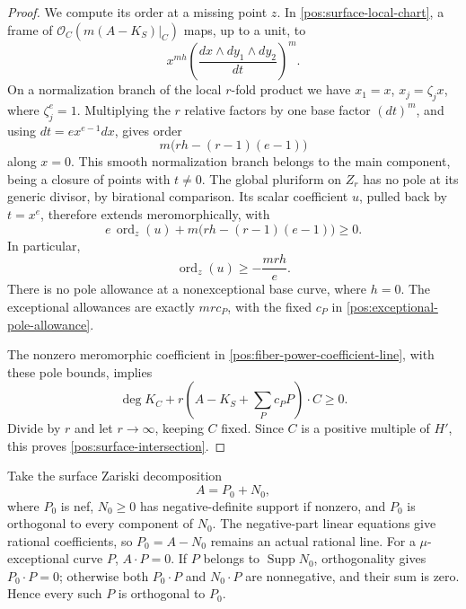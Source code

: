 \documentclass[11pt,letterpaper]{article}
\theoremstyle{definition}
\theoremstyle{remark}
\begin{document}
\begin{proof}
We compute its order at a missing point \(z\). In
\eqref{pos:surface-local-chart}, a frame of
\(\mathcal{O}_C(m(A-K_S)|_C)\) maps, up to a unit, to
\[
 x^{mh}\left(\frac{dx\wedge dy_1\wedge dy_2}{dt}\right)^{\!m}.
\]
On a normalization branch of the local \(r\)-fold product we have
\(x_1=x\), \(x_j=\zeta_jx\), where \(\zeta_j^e=1\). Multiplying
the \(r\) relative factors by one base factor \((dt)^m\), and using
\(dt=ex^{e-1}dx\), gives order
\begin{equation}\label{pos:fiber-power-order}
 m\bigl(rh-(r-1)(e-1)\bigr)
\end{equation}
along \(x=0\). This smooth normalization branch belongs to the main
component, being a closure of points with \(t\ne0\). The global
pluriform on \(Z_r\) has no pole at its generic divisor, by birational
comparison. Its scalar coefficient \(u\), pulled back by \(t=x^e\),
therefore extends meromorphically, with
\[
 e\,\operatorname{ord}_z(u)+m\bigl(rh-(r-1)(e-1)\bigr)\geq0.
\]
In particular,
\begin{equation}\label{pos:fiber-power-pole-bound}
 \operatorname{ord}_z(u)\geq-\frac{mrh}{e}.
\end{equation}
There is no pole allowance at a nonexceptional base curve, where
\(h=0\). The exceptional allowances are exactly
\(mr c_P\), with the fixed \(c_P\) in
\eqref{pos:exceptional-pole-allowance}.

The nonzero meromorphic coefficient in
\eqref{pos:fiber-power-coefficient-line}, with these pole bounds,
implies
\[
 \deg K_C+r\left(A-K_S+\sum_Pc_PP\right)\cdot C\geq0.
\]
Divide by \(r\) and let \(r\to\infty\), keeping \(C\) fixed.
Since \(C\) is a positive multiple of \(H'\), this proves
\eqref{pos:surface-intersection}.
\end{proof}

Take the surface Zariski decomposition \cite{BHPV}
\begin{equation}\label{pos:zariski-decomposition}
 A=P_0+N_0,
\end{equation}
where \(P_0\) is nef, \(N_0\geq0\) has negative-definite support
if nonzero, and \(P_0\) is orthogonal to every component of \(N_0\).
The negative-part linear equations give rational coefficients, so
\(P_0=A-N_0\) remains an actual rational line. For a
\(\mu\)-exceptional curve \(P\), \(A\cdot P=0\). If \(P\) belongs
to \(\operatorname{Supp} N_0\), orthogonality gives \(P_0\cdot P=0\); otherwise
both \(P_0\cdot P\) and \(N_0\cdot P\) are nonnegative, and their
sum is zero. Hence every such \(P\) is orthogonal to \(P_0\).
\end{document}
